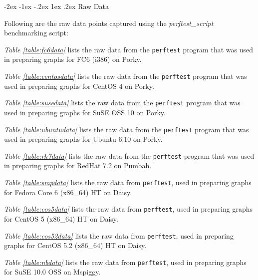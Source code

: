 \documentclass[letterpaper,final,notitlepage,twocolumn,10pt,twoside]{article}
\makeatletter
\let\large = \normalsize
\let\normalsize = \small
\let\small = \footnotesize
\let\footnotesize = \scriptsize
\let\scriptsize = \tiny
\renewcommand\section{\@startsection {section}{1}{\z@}%
                                   {-2ex \@plus -1ex \@minus -.2ex}%
                                   {1ex \@plus .2ex}%
                                   {\normalfont\large\bfseries}}
\makeatother
\begin{document}
\begin{appendix}
\section{Raw Data}
\label{section:rawdata}

Following are the raw data points captured using the \textsl{perftest\_script} benchmarking script:

\textit{Table \ref{table:fc6data}} lists the raw data from the \texttt{perftest} program that was
used in preparing graphs for FC6 (i386) on Porky.

\textit{Table \ref{table:centosdata}} lists the raw data from the \texttt{perftest} program that was
used in preparing graphs for CentOS 4 on Porky.

\textit{Table \ref{table:susedata}} lists the raw data from the \texttt{perftest} program that was
used in preparing graphs for SuSE OSS 10 on Porky.

\textit{Table \ref{table:ubuntudata}} lists the raw data from the \texttt{perftest} program that was
used in preparing graphs for Ubuntu 6.10 on Porky.

\textit{Table \ref{table:rh7data}} lists the raw data from the \texttt{perftest} program that was
used in preparing graphs for RedHat 7.2 on Pumbah.

\textit{Table \ref{table:smpdata}} lists the raw data from \texttt{perftest}, used in preparing
graphs for Fedora Core 6 (x86\_64) HT on Daisy.

\textit{Table \ref{table:cos5data}} lists the raw data from \texttt{perftest}, used in preparing
graphs for CentOS 5 (x86\_64) HT on Daisy.

\textit{Table \ref{table:cos52data}} lists the raw data from \texttt{perftest}, used in preparing
graphs for CentOS 5.2 (x86\_64) HT on Daisy.

\textit{Table \ref{table:nbdata}} lists the raw data from \texttt{perftest}, used in preparing
graphs for SuSE 10.0 OSS on Mspiggy.


\end{appendix}
\end{document}
